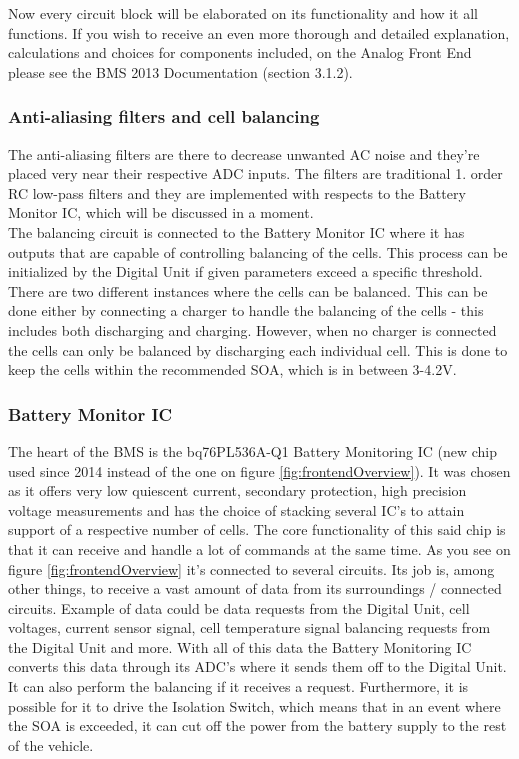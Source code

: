 Now every circuit block will be elaborated on its functionality and how it all functions. If you wish to receive an even more thorough and detailed explanation, calculations and choices for components included, on the Analog Front End please see the BMS 2013 Documentation \cite{BMSDocumentation} (section 3.1.2).

\subsubsection{Anti-aliasing filters and cell balancing}
The anti-aliasing filters are there to decrease unwanted AC noise and they're placed very near their respective ADC inputs. The filters are traditional 1. order RC low-pass filters and they are implemented with respects to the Battery Monitor IC, which will be discussed in a moment.\\
The balancing circuit is connected to the Battery Monitor IC where it has outputs that are capable of controlling balancing of the cells. This process can be initialized by the Digital Unit if given parameters exceed a specific threshold.\\
There are two different instances where the cells can be balanced. This can be done either by connecting a charger to handle the balancing of the cells - this includes both discharging and charging. However, when no charger is connected the cells can only be balanced by discharging each individual cell. This is done to keep the cells within the recommended SOA, which is in between 3-4.2V.

\subsubsection{Battery Monitor IC}
The heart of the BMS is the bq76PL536A-Q1 Battery Monitoring IC (new chip used since 2014 instead of the one on figure \vref{fig:frontendOverview}). It was chosen as it offers very low quiescent current, secondary protection, high precision voltage measurements and has the choice of stacking several IC's to attain support of a respective number of cells. The core functionality of this said chip is that it can receive and handle a lot of commands at the same time. As you see on figure \vref{fig:frontendOverview} it's connected to several circuits. Its job is, among other things, to receive a vast amount of data from its surroundings / connected circuits. Example of data could be data requests from the Digital Unit, cell voltages, current sensor signal, cell temperature signal balancing requests from the Digital Unit and more. With all of this data the Battery Monitoring IC converts this data through its ADC's where it sends them off to the Digital Unit. It can also perform the balancing if it receives a request. Furthermore, it is possible for it to drive the Isolation Switch, which means that in an event where the SOA is exceeded, it can cut off the power from the battery supply to the rest of the vehicle.

